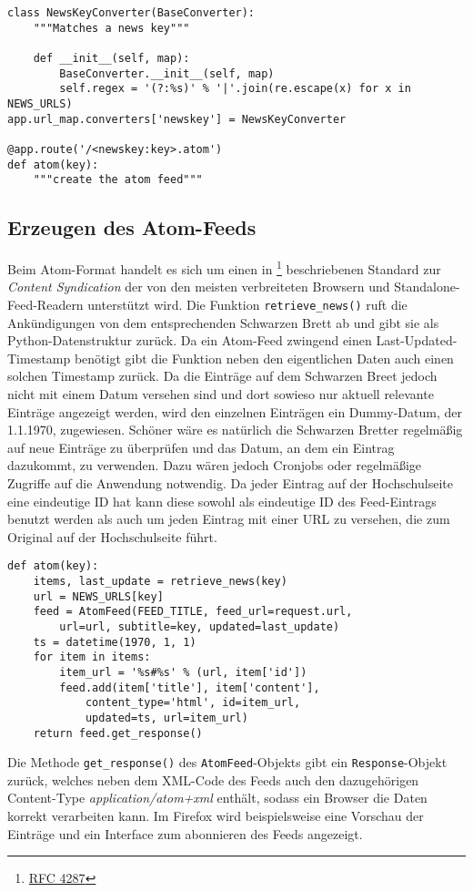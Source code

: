 \begin{lstlisting}[caption=HSKAtom - Routing,label=lst:hskatom-route-atom]
class NewsKeyConverter(BaseConverter):
    """Matches a news key"""

    def __init__(self, map):
        BaseConverter.__init__(self, map)
        self.regex = '(?:%s)' % '|'.join(re.escape(x) for x in NEWS_URLS)
app.url_map.converters['newskey'] = NewsKeyConverter

@app.route('/<newskey:key>.atom')
def atom(key):
    """create the atom feed"""
\end{lstlisting}

\subsection{Erzeugen des Atom-Feeds}

Beim Atom-Format handelt es sich um einen in \footnote{\href{http://www.ietf.org/rfc/rfc4287}{RFC
4287}} beschriebenen Standard zur \emph{Content Syndication} der von den meisten verbreiteten
Browsern und Standalone-Feed-Readern unterstützt wird. Die Funktion \lstinline{retrieve_news()} ruft
die Ankündigungen von dem entsprechenden Schwarzen Brett ab und gibt sie als Python-Datenstruktur
zurück. Da ein Atom-Feed zwingend einen Last-Updated-Timestamp benötigt gibt die Funktion neben den
eigentlichen Daten auch einen solchen Timestamp zurück. Da die Einträge auf dem Schwarzen Breet
jedoch nicht mit einem Datum versehen sind und dort sowieso nur aktuell relevante Einträge angezeigt
werden, wird den einzelnen Einträgen ein Dummy-Datum, der 1.1.1970, zugewiesen. Schöner wäre es
natürlich die Schwarzen Bretter regelmäßig auf neue Einträge zu überprüfen und das Datum, an dem ein
Eintrag dazukommt, zu verwenden. Dazu wären jedoch Cronjobs oder regelmäßige Zugriffe auf die
Anwendung notwendig. Da jeder Eintrag auf der Hochschulseite eine eindeutige ID hat kann diese
sowohl als eindeutige ID des Feed-Eintrags benutzt werden als auch um jeden Eintrag mit einer URL zu
versehen, die zum Original auf der Hochschulseite führt.

\begin{lstlisting}[caption=HSKAtom - Atom-Feed,label=lst:hskatom-atom]
def atom(key):
    items, last_update = retrieve_news(key)
    url = NEWS_URLS[key]
    feed = AtomFeed(FEED_TITLE, feed_url=request.url,
        url=url, subtitle=key, updated=last_update)
    ts = datetime(1970, 1, 1)
    for item in items:
        item_url = '%s#%s' % (url, item['id'])
        feed.add(item['title'], item['content'],
            content_type='html', id=item_url,
            updated=ts, url=item_url)
    return feed.get_response()
\end{lstlisting}

Die Methode \lstinline{get_response()} des \lstinline{AtomFeed}-Objekts gibt ein
\lstinline{Response}-Objekt zurück, welches neben dem XML-Code des Feeds auch den dazugehörigen
Content-Type \emph{application/atom+xml} enthält, sodass ein Browser die Daten korrekt verarbeiten
kann. Im Firefox wird beispielsweise eine Vorschau der Einträge und ein Interface zum abonnieren des
Feeds angezeigt.

